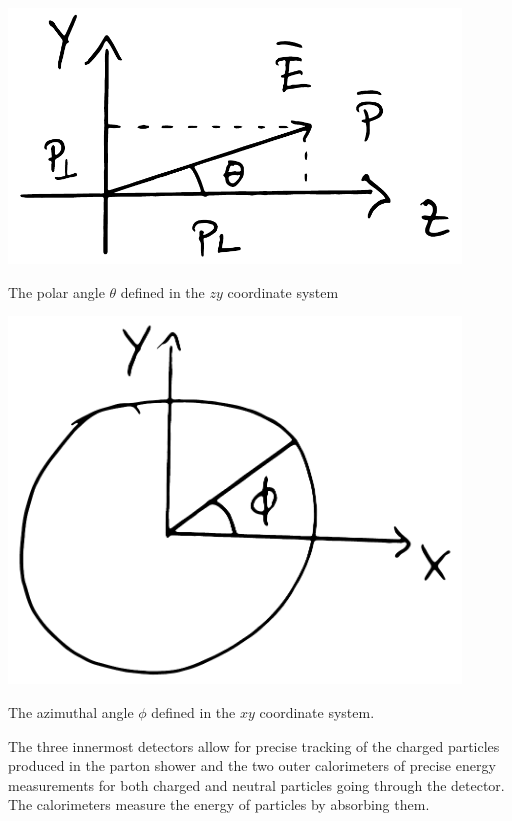 \begin{marginfigure}
  \centerfloat
  \includegraphics[width=0.9\textwidth]{figures/yz_coordinate_system/yz_coords.pdf}
  \caption[Polar angle]{The polar angle $\theta$ defined in the $zy$ coordinate system}
  \label{fig:hep:aleph_detector_theta}
\end{marginfigure}
\begin{marginfigure}
  \centerfloat
  \includegraphics[width=0.9\textwidth]{figures/xy_coordinate_system/xy_coords.pdf}
  \caption[Azimuthal angle]{The azimuthal angle $\phi$ defined in the $xy$ coordinate system. }
  \label{fig:hep:aleph_detector_phi}
\end{marginfigure}

The three innermost detectors allow for precise tracking of the charged particles produced in the parton shower and the two outer calorimeters of precise energy measurements for both charged and neutral particles going through the detector. The calorimeters measure the energy of particles by absorbing them. 

